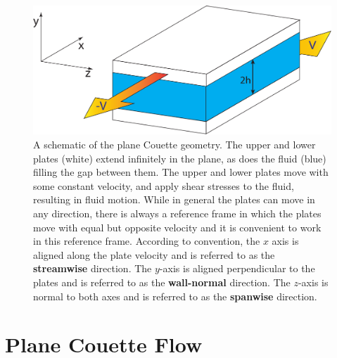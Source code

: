 \begin{figure}[h!]
\centerline{
\includegraphics[scale=0.4]{Figs/planeCouetteDiagram}}
\caption[A schematic of the plane Couette geometry.]{A schematic of the plane Couette geometry. The upper and lower plates (white) extend infinitely in the plane, as does the fluid (blue) filling the gap between them. The upper and lower plates move with some constant velocity, and apply shear stresses to the fluid, resulting in fluid motion. While in general the plates can move in any direction, there is always a reference frame in which the plates move with equal but opposite velocity and it is convenient to work in this reference frame. According to convention, the $x$ axis is aligned along the plate velocity and is referred to as the {\bf streamwise} direction. The $y$-axis is aligned perpendicular to the plates and is referred to as the {\bf wall-normal} direction. The $z$-axis is normal to both axes and is referred to as the {\bf spanwise} direction.}\label{fig:planeCouette}
\end{figure}

\section{Plane Couette Flow} 


